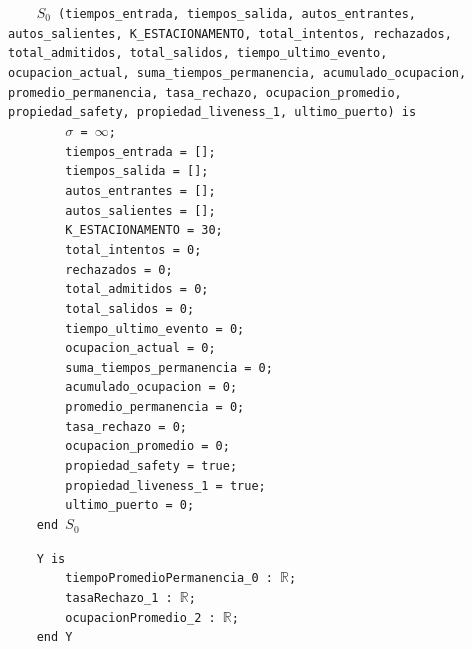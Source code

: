 \documentclass[12pt]{article}
\begin{document}
\begin{tcolorbox}[
    colback=black!5!white,
    colframe=black!80!white,
    boxrule=0.8pt,
    arc=2pt,
    left=5pt,
    right=5pt,
    top=5pt,
    bottom=5pt,
    fontupper=\ttfamily,
    breakable
]
\begin{flushleft}
\texttt{~~~~$S_0$ (tiempos\_entrada, tiempos\_salida, autos\_entrantes, autos\_salientes, K\_ESTACIONAMENTO, total\_intentos, rechazados, total\_admitidos, total\_salidos, tiempo\_ultimo\_evento, ocupacion\_actual, suma\_tiempos\_permanencia, acumulado\_ocupacion, promedio\_permanencia, tasa\_rechazo, ocupacion\_promedio, propiedad\_safety, propiedad\_liveness\_1, ultimo\_puerto) is} \\[5pt]
\texttt{~~~~~~~~}$\sigma$\texttt{ = }$\infty$\texttt{;} \\
\texttt{~~~~~~~~tiempos\_entrada = [];} \\
\texttt{~~~~~~~~tiempos\_salida = [];} \\
\texttt{~~~~~~~~autos\_entrantes = [];} \\
\texttt{~~~~~~~~autos\_salientes = [];} \\
\texttt{~~~~~~~~K\_ESTACIONAMENTO = 30;} \\
\texttt{~~~~~~~~total\_intentos = 0;} \\
\texttt{~~~~~~~~rechazados = 0;} \\
\texttt{~~~~~~~~total\_admitidos = 0;} \\
\texttt{~~~~~~~~total\_salidos = 0;} \\
\texttt{~~~~~~~~tiempo\_ultimo\_evento = 0;} \\
\texttt{~~~~~~~~ocupacion\_actual = 0;} \\
\texttt{~~~~~~~~suma\_tiempos\_permanencia = 0;} \\
\texttt{~~~~~~~~acumulado\_ocupacion = 0;} \\
\texttt{~~~~~~~~promedio\_permanencia = 0;} \\
\texttt{~~~~~~~~tasa\_rechazo = 0;} \\
\texttt{~~~~~~~~ocupacion\_promedio = 0;} \\
\texttt{~~~~~~~~propiedad\_safety = true;} \\
\texttt{~~~~~~~~propiedad\_liveness\_1 = true;} \\
\texttt{~~~~~~~~ultimo\_puerto = 0;} \\
\texttt{~~~~end }$S_0$
\end{flushleft}

\begin{flushleft}
\texttt{~~~~Y is} \\
\texttt{~~~~~~~~tiempoPromedioPermanencia\_0 : }\(\mathbb{R}\)\texttt{;} \\
\texttt{~~~~~~~~tasaRechazo\_1 : }\(\mathbb{R}\)\texttt{;} \\
\texttt{~~~~~~~~ocupacionPromedio\_2 : }\(\mathbb{R}\)\texttt{;} \\
\texttt{~~~~end Y}
\end{flushleft}


\end{tcolorbox}
\end{document}
